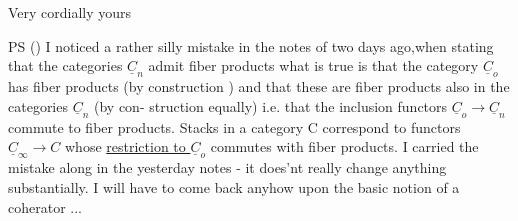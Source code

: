 Very cordially yours 

PS  ()  I noticed a rather silly mistake in the notes of two days
ago,when stating that the categories $\underline{C}_n$ admit fiber products \unsure{\over{-}{:}} what is
true is that the category $\underline{C}_o$ has fiber products (by construction ) 
and that these are fiber products also in the categories $\underline{C}_n$ (by con-%
struction equally) i.e. that the inclusion functors $\underline{C}_o \to \underline{C}_n$ commute to
fiber products.  Stacks in a category C correspond to functors
$\underline{C}_\infty \to C$  whose \uline{restriction to $\underline{C}_o$} commutes with fiber products. I carried
the mistake along in the  yesterday notes  -  it does'nt really
change anything substantially.  I will have to come back anyhow upon the
basic notion of a coherator ...

